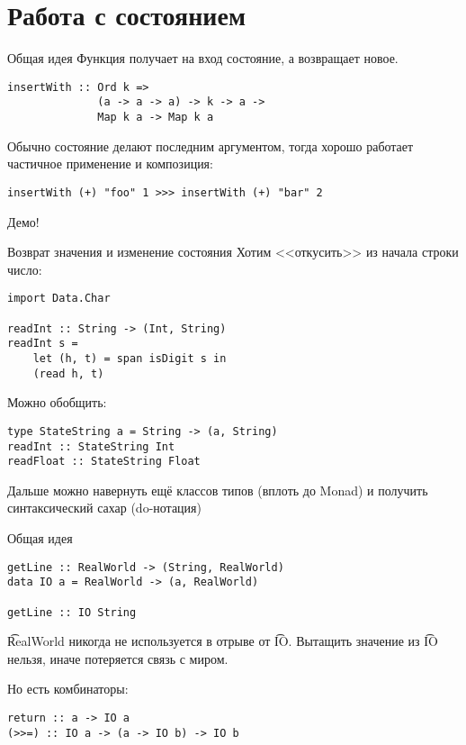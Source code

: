 \section{Работа с состоянием}
\begin{frame}
\end{frame}

\begin{frame}[t,fragile]{Общая идея}
	Функция получает на вход состояние, а возвращает новое.

\begin{verbatim}
insertWith :: Ord k =>
              (a -> a -> a) -> k -> a ->
              Map k a -> Map k a
\end{verbatim}

	Обычно состояние делают последним аргументом, тогда хорошо
	работает частичное применение и композиция:
\begin{verbatim}
insertWith (+) "foo" 1 >>> insertWith (+) "bar" 2
\end{verbatim}

	Демо!
\end{frame}

\begin{frame}[t,fragile]{Возврат значения и изменение состояния}
	Хотим <<откусить>> из начала строки число:
\begin{verbatim}
import Data.Char

readInt :: String -> (Int, String)
readInt s =
    let (h, t) = span isDigit s in
    (read h, t)
\end{verbatim}

	Можно обобщить:
\begin{verbatim}
type StateString a = String -> (a, String)
readInt :: StateString Int
readFloat :: StateString Float
\end{verbatim}
	Дальше можно навернуть ещё классов типов (вплоть до Monad)
	и получить синтаксический сахар (do-нотация)
\end{frame}

\begin{frame}[t,fragile]{Общая идея}
\begin{verbatim}
getLine :: RealWorld -> (String, RealWorld)
data IO a = RealWorld -> (a, RealWorld)

getLine :: IO String
\end{verbatim}
	\t{RealWorld} никогда не используется в отрыве от \t{IO}.
	Вытащить значение из \t{IO} нельзя, иначе потеряется связь с миром.

	Но есть комбинаторы:
\begin{verbatim}
return :: a -> IO a
(>>=) :: IO a -> (a -> IO b) -> IO b
\end{verbatim}
\end{frame}
